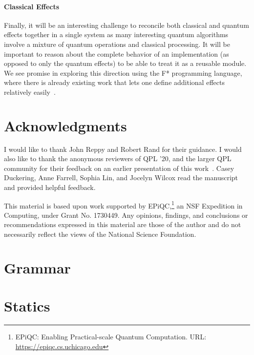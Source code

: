 \paragraph{Classical Effects} Finally, it will be an interesting challenge to reconcile both classical and quantum effects together in a single system as many interesting quantum algorithms involve a mixture of quantum operations and classical processing. It will be important to reason about the complete behavior of an implementation (as opposed to only the quantum effects) to be able to treat it as a reusable module. We see promise in exploring this direction using the F* programming language, where there is already existing work that lets one define additional effects relatively easily~\parencite{dm4free2017}.

\section*{Acknowledgments}
I would like to thank John Reppy and Robert Rand for their guidance. I would also like to thank the anonymous reviewers of QPL '20, and the larger QPL community for their feedback on an earlier presentation of this work~\parencite{qhtt20}. Casey Duckering, Anne Farrell, Sophia Lin, and Jocelyn Wilcox read the manuscript and provided helpful feedback.

This material is based upon work supported by EPiQC,\footnote{EPiQC: Enabling Practical-scale Quantum Computation. {\scriptsize URL:} \url{https://epiqc.cs.uchicago.edu}} an NSF Expedition in Computing, under Grant No. 1730449. Any opinions, findings, and conclusions or recommendations expressed in this material are those
of the author and do not necessarily reflect the views of the National Science Foundation.

\printbibliography[heading=bibintoc]

\appendix

\newpage

\section{Grammar}
\label{app:grammar}


\section{Statics}
\label{app:rules}

